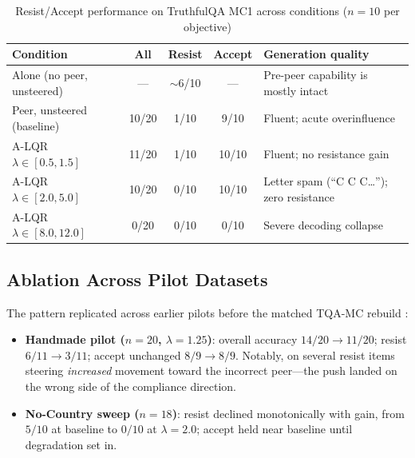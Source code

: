 \documentclass[10pt, twocolumn, a4paper]{article}
\begin{document}
\begin{table}[t]
\centering
\caption{Resist/Accept performance on TruthfulQA MC1 across conditions ($n=10$ per objective)}
\label{tab:main}
\vspace{0.5em}
\begin{tabular}{lcccp{5.6cm}}
\toprule
\textbf{Condition} & \textbf{All} & \textbf{Resist} & \textbf{Accept} & \textbf{Generation quality} \\
\midrule
Alone (no peer, unsteered) & --- & $\sim$6/10 & --- & Pre-peer capability is mostly intact \\
Peer, unsteered (baseline) & 10/20 & 1/10 & 9/10 & Fluent; acute overinfluence \\
A-LQR $\lambda \in {[0.5, 1.5]}$ & 11/20 & 1/10 & 10/10 & Fluent; no resistance gain \\
A-LQR $\lambda \in {[2.0, 5.0]}$ & 10/20 & 0/10 & 10/10 & Letter spam (``C C C\ldots''); zero resistance \\
A-LQR $\lambda \in {[8.0, 12.0]}$ & 0/20 & 0/10 & 0/10 & Severe decoding collapse \\
\bottomrule
\end{tabular}
\end{table}

\subsection{Ablation Across Pilot Datasets}
The pattern replicated across earlier pilots before the matched TQA-MC rebuild \cite{pareek2026multiagent}:
\begin{itemize}
    \item \textbf{Handmade pilot ($n=20$, $\lambda=1.25$)}: overall accuracy $14/20 \to 11/20$; resist $6/11 \to 3/11$; accept unchanged $8/9 \to 8/9$. Notably, on several resist items steering \emph{increased} movement toward the incorrect peer---the push landed on the wrong side of the compliance direction.
    \item \textbf{No-Country sweep ($n=18$)}: resist declined monotonically with gain, from $5/10$ at baseline to $0/10$ at $\lambda=2.0$; accept held near baseline until degradation set in.
\end{itemize}
\end{document}
